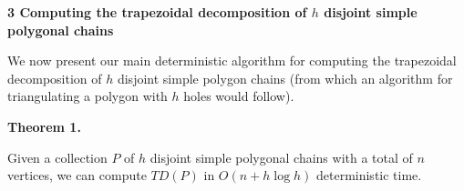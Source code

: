 \documentclass[10pt,a4paper]{article}
\begin{document}
\par
\par
\par\medskip\noindent\textbf{3 Computing the trapezoidal decomposition of $h$ disjoint simple polygonal chains}\par
We now present our main deterministic algorithm for computing the trapezoidal decomposition of $h$ disjoint simple polygon chains (from which an algorithm for triangulating a polygon with $h$ holes would follow).
\par
\par

\par\medskip\noindent\textbf{Theorem 1.}\par
Given a collection $P$ of $h$ disjoint simple polygonal chains with a total of $n$ vertices, we can compute $\textit{TD}(P)$ in $O(n+h\log h)$ deterministic time.
\par
\par
\par
\end{document}
